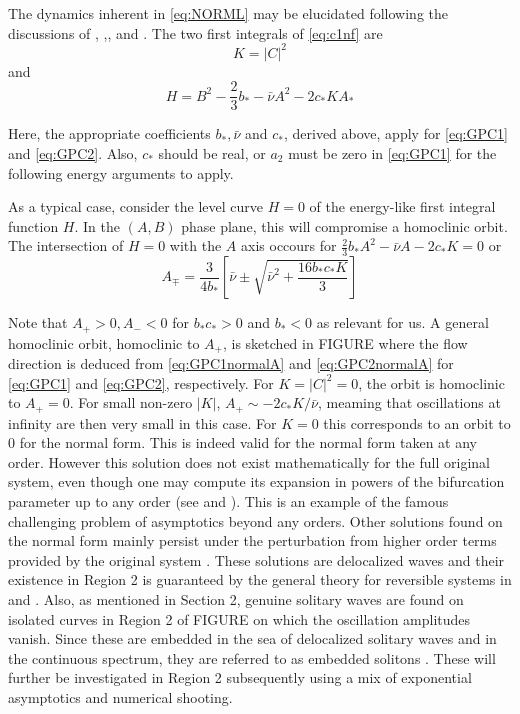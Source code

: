 The dynamics inherent in \eqref{eq:NORML} may be elucidated following the discussions of \cite{IK}, \cite{Lombardi1},\cite{Lombardi2}, and \cite{IA}.
The two first integrals of \eqref{eq:c1nf}  are
\begin{equation}
K = \left| C \right|^2
\end{equation}
and
\begin{equation}
H = B^2 - \frac{2}{3} b_* - \bar{\nu} A^2 - 2 c_* K A_*
\end{equation}

Here, the appropriate coefficients $b_*, \bar{\nu}$ and $ c_*$, derived above, apply for \eqref{eq:GPC1} and \eqref{eq:GPC2}. 
Also, $c_*$ should be real, or $a_2$ must be zero in \eqref{eq:GPC1} for the following energy arguments to apply.


As a typical case, consider  the level curve $H=0$ of the energy-like first integral function $H$. In the $(A,B)$ phase plane,
this will compromise a homoclinic orbit. The intersection of $H=0$ with the $A$ axis occours for $ \frac{2}{3} b_* A^2 - \bar{\nu}A - 2 c_* K = 0$ or
\begin{equation}
A_{\mp} = \frac{3}{4 b_*} \left[ \bar{\nu} \pm \sqrt{ \bar{\nu}^2 + \frac{16 b_* c_* K}{3} } \right]
\end{equation}

Note that $A_+ > 0, A_- < 0 $ for $b_* c_* > 0 $ and $b_* < 0$ as relevant for us. A general homoclinic orbit, homoclinic to $A_+$, is sketched
in FIGURE where the flow direction is deduced from \eqref{eq:GPC1normalA} and \eqref{eq:GPC2normalA} for \eqref{eq:GPC1} and \eqref{eq:GPC2}, respectively.
For $K=\left|C\right|^2 = 0 $, the orbit is homoclinic to $A_+=0$. For small non-zero $\left|K\right|$, $ A_+ \sim - 2 c_* K / \bar{\nu}$, meaming that
oscillations at infinity are then very small in this case. For $K=0$ this corresponds to an orbit to 0 for the normal form. This is indeed valid for
the normal form taken at any order. However this solution does not exist mathematically for the full original system, even though
one may compute its expansion in powers of the bifurcation parameter up to any order (see \cite{Lombardi1} and \cite{Lombardi2}). This is an example
of the famous challenging problem of asymptotics beyond any orders. Other solutions found on the normal form mainly persist under the perturbation from
higher order terms provided by the original system \cite{IK}. These solutions are delocalized waves and their existence in Region 2 is guaranteed
by the general theory for reversible systems in \cite{Lombardi1} and \cite{Lombardi2}. Also, as mentioned in Section 2, genuine solitary waves are found on isolated
curves in Region 2 of FIGURE on which the oscillation amplitudes vanish. Since these are embedded in the sea of delocalized solitary waves and in the 
continuous spectrum, they are referred to as embedded solitons \cite{CMYK}. These will further be investigated in Region 2 subsequently using a mix of
exponential asymptotics and numerical shooting.


